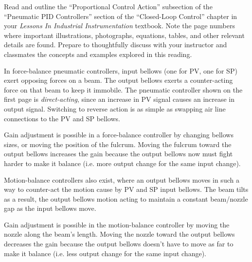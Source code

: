 

Read and outline the ``Proportional Control Action'' subsection of the ``Pneumatic PID Controllers'' section of the ``Closed-Loop Control'' chapter in your {\it Lessons In Industrial Instrumentation} textbook.  Note the page numbers where important illustrations, photographs, equations, tables, and other relevant details are found.  Prepare to thoughtfully discuss with your instructor and classmates the concepts and examples explored in this reading.














In force-balance pneumatic controllers, input bellows (one for PV, one for SP) exert opposing forces on a beam.  The output bellows exerts a counter-acting force on that beam to keep it immobile.  The pneumatic controller shown on the first page is {\it direct-acting}, since an increase in PV signal causes an increase in output signal.  Switching to reverse action is as simple as swapping air line connections to the PV and SP bellows.

Gain adjustment is possible in a force-balance controller by changing bellows sizes, or moving the position of the fulcrum.  Moving the fulcrum toward the output bellows increases the gain because the output bellows now must fight harder to make it balance (i.e. more output change for the same input change).

\vskip 10pt

Motion-balance controllers also exist, where an output bellows moves in such a way to counter-act the motion cause by PV and SP input bellows.  The beam tilts as a result, the output bellows motion acting to maintain a constant beam/nozzle gap as the input bellows move.

Gain adjustment is possible in the motion-balance controller by moving the nozzle along the beam's length.  Moving the nozzle toward the output bellows decreases the gain because the output bellows doesn't have to move as far to make it balance (i.e. less output change for the same input change).










